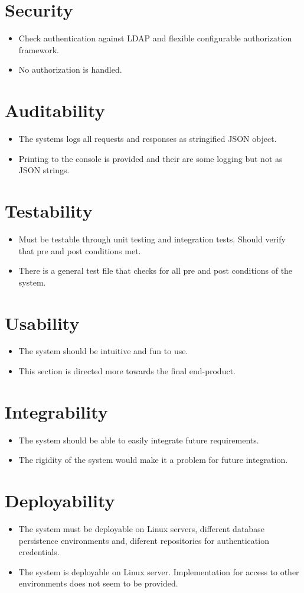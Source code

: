 \section{Security}
	\begin{itemize}
		\item Check authentication against LDAP and flexible configurable authorization framework.
		\item No authorization is handled.
	\end{itemize}
\section{Auditability}
	\begin{itemize}
		\item The systems logs all requests and responses as stringified JSON object.
		\item Printing to the console is provided and their are some logging but not as JSON strings.
	\end{itemize}
\section{Testability}
	\begin{itemize}
		\item Must be testable through unit testing and integration tests. Should verify that pre and post conditions met.
		\item There is a general test file that checks for all pre and post conditions of the system.
	\end{itemize}
\section{Usability}
	\begin{itemize}
		\item The system should be intuitive and fun to use.
		\item This section is directed more towards the final end-product.
	\end{itemize}
\section{Integrability}
	\begin{itemize}
		\item The system should be able to easily integrate future requirements.
		\item The rigidity of the system would make it a problem for future integration.
	\end{itemize}
\section{Deployability}
	\begin{itemize}
		\item The system must be deployable on Linux servers, different database persistence environments and, diferent repositories for authentication credentials.
		\item The system is deployable on Linux server. Implementation for access to other environments does not seem to be provided.
	\end{itemize}
